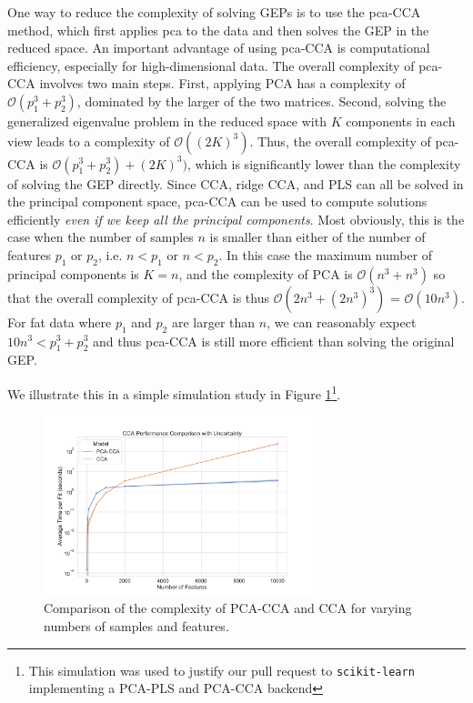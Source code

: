 One way to reduce the complexity of solving GEPs is to use the \acrshort{pca}-CCA method, which first applies \acrshort{pca} to the data and then solves the GEP in the reduced space.
An important advantage of using \acrshort{pca}-CCA is computational efficiency, especially for high-dimensional data.
The overall complexity of \acrshort{pca}-CCA involves two main steps.
First, applying PCA has a complexity of \( \mathcal{O}(p_1^3+ p_2^3) \), dominated by the larger of the two matrices.
Second, solving the generalized eigenvalue problem in the reduced space with \( K \) components in each view leads to a complexity of \( \mathcal{O}((2K)^3) \).
Thus, the overall complexity of \acrshort{pca}-CCA is \( \mathcal{O}(p_1^3+ p_2^3) + (2K)^3) \), which is significantly lower than the complexity of solving the GEP directly.
Since CCA, ridge CCA, and PLS can all be solved in the principal component space, \acrshort{pca}-CCA can be used to compute solutions efficiently \textit{even if we keep all the principal components}.
Most obviously, this is the case when the number of samples \( n \) is smaller than either of the number of features \( p_1 \) or \( p_2 \), i.e. \( n < p_1 \) or \( n < p_2 \).
In this case the maximum number of principal components is \( K=n \), and the complexity of PCA is \( \mathcal{O}(n^3+ n^3) \) so that the overall complexity of \acrshort{pca}-CCA is thus \( \mathcal{O}(2n^3+(2n^3)^3) \) = \( \mathcal{O}(10n^3) \).
For fat data where \( p_1 \) and \( p_2 \) are larger than \( n \), we can reasonably expect $10n^3<p_1^3+ p_2^3$ and thus \acrshort{pca}-CCA is still more efficient than solving the original GEP.

We illustrate this in a simple simulation study in Figure \ref{fig:pca-cca-complexity}\footnote{This simulation was used to justify our pull request to \texttt{scikit-learn}\citep{pedregosa2011scikit} implementing a PCA-PLS and PCA-CCA backend}.

 \begin{figure}
     \centering
     \includegraphics[width=0.7\textwidth]{figures/benchmarks/ccapca_comparison_log}
     \caption{Comparison of the complexity of PCA-CCA and CCA for varying numbers of samples and features.}
     \label{fig:pca-cca-complexity}
 \end{figure}

